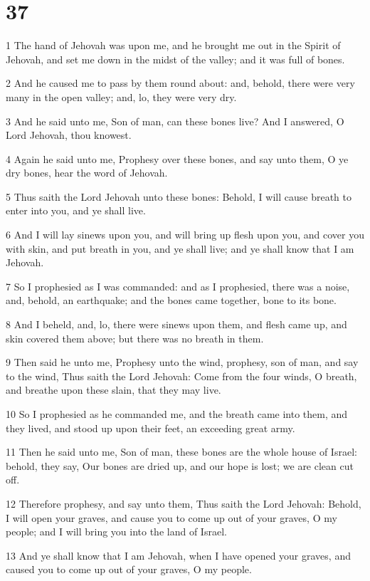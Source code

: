\chapter{37}

\par 1 The hand of Jehovah was upon me, and he brought me out in the Spirit of Jehovah, and set me down in the midst of the valley; and it was full of bones.
\par 2 And he caused me to pass by them round about: and, behold, there were very many in the open valley; and, lo, they were very dry.
\par 3 And he said unto me, Son of man, can these bones live? And I answered, O Lord Jehovah, thou knowest.
\par 4 Again he said unto me, Prophesy over these bones, and say unto them, O ye dry bones, hear the word of Jehovah.
\par 5 Thus saith the Lord Jehovah unto these bones: Behold, I will cause breath to enter into you, and ye shall live.
\par 6 And I will lay sinews upon you, and will bring up flesh upon you, and cover you with skin, and put breath in you, and ye shall live; and ye shall know that I am Jehovah.
\par 7 So I prophesied as I was commanded: and as I prophesied, there was a noise, and, behold, an earthquake; and the bones came together, bone to its bone.
\par 8 And I beheld, and, lo, there were sinews upon them, and flesh came up, and skin covered them above; but there was no breath in them.
\par 9 Then said he unto me, Prophesy unto the wind, prophesy, son of man, and say to the wind, Thus saith the Lord Jehovah: Come from the four winds, O breath, and breathe upon these slain, that they may live.
\par 10 So I prophesied as he commanded me, and the breath came into them, and they lived, and stood up upon their feet, an exceeding great army.
\par 11 Then he said unto me, Son of man, these bones are the whole house of Israel: behold, they say, Our bones are dried up, and our hope is lost; we are clean cut off.
\par 12 Therefore prophesy, and say unto them, Thus saith the Lord Jehovah: Behold, I will open your graves, and cause you to come up out of your graves, O my people; and I will bring you into the land of Israel.
\par 13 And ye shall know that I am Jehovah, when I have opened your graves, and caused you to come up out of your graves, O my people.
